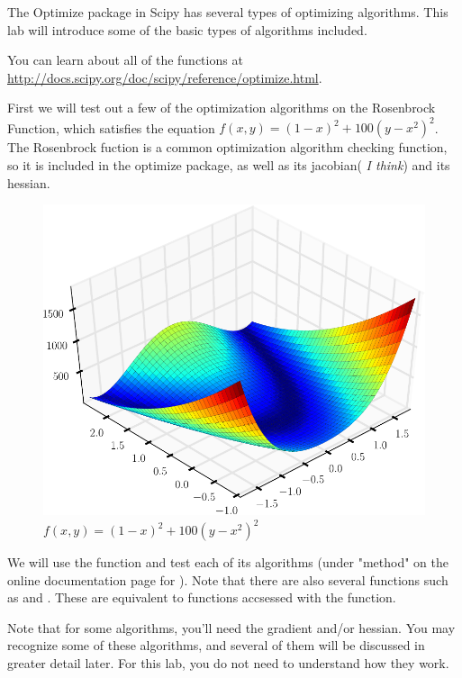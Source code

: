 \label{lab:Optimization1}

The Optimize package in Scipy has several types of optimizing algorithms.
This lab will introduce some of the basic types of algorithms included.

You can learn about all of the functions at \url{http://docs.scipy.org/doc/scipy/reference/optimize.html}.

First we will test out a few of the optimization algorithms on the Rosenbrock Function, which satisfies the equation $f(x,y) = (1-x)^2 + 100(y-x^2)^2$.
The Rosenbrock fuction is a common optimization algorithm checking function, so it is included in the optimize package, as well as its jacobian( \emph{I think}) and its hessian.

\begin{figure}
\includegraphics[width=\textwidth]{Rosenbrock.pdf}
\caption{$f(x,y) = (1-x)^2 + 100(y-x^2)^2$}
\label{opt:rosenbrock}
\end{figure}

We will use the  function and test each of its algorithms (under "method" on the online documentation page for ). Note that there are also several functions such as  and . These are equivalent to functions accsessed with the  function.

Note that for some algorithms, you'll need the gradient and/or hessian.
You may recognize some of these algorithms, and several of them will be discussed in greater detail later. For this lab, you do not need to understand how they work.

